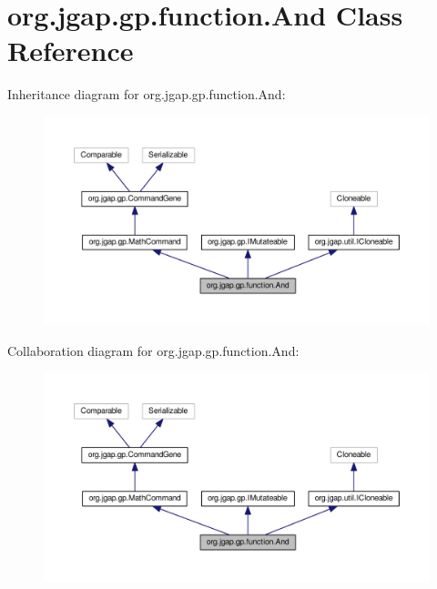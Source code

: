 \hypertarget{classorg_1_1jgap_1_1gp_1_1function_1_1_and}{\section{org.\-jgap.\-gp.\-function.\-And Class Reference}
\label{classorg_1_1jgap_1_1gp_1_1function_1_1_and}
}


Inheritance diagram for org.\-jgap.\-gp.\-function.\-And\-:
\nopagebreak
\begin{figure}[H]
\begin{center}
\leavevmode
\includegraphics[width=350pt]{classorg_1_1jgap_1_1gp_1_1function_1_1_and__inherit__graph}
\end{center}
\end{figure}


Collaboration diagram for org.\-jgap.\-gp.\-function.\-And\-:
\nopagebreak
\begin{figure}[H]
\begin{center}
\leavevmode
\includegraphics[width=350pt]{classorg_1_1jgap_1_1gp_1_1function_1_1_and__coll__graph}
\end{center}
\end{figure}
